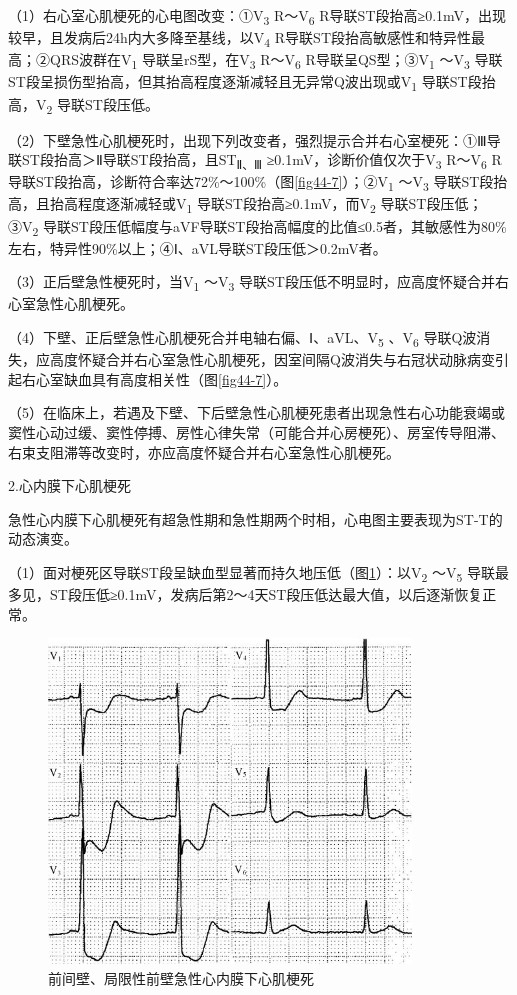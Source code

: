 （1）右心室心肌梗死的心电图改变：①V\textsubscript{3}
R～V\textsubscript{6}
R导联ST段抬高≥0.1mV，出现较早，且发病后24h内大多降至基线，以V\textsubscript{4}
R导联ST段抬高敏感性和特异性最高；②QRS波群在V\textsubscript{1}
导联呈rS型，在V\textsubscript{3} R～V\textsubscript{6}
R导联呈QS型；③V\textsubscript{1} ～V\textsubscript{3}
导联ST段呈损伤型抬高，但其抬高程度逐渐减轻且无异常Q波出现或V\textsubscript{1}
导联ST段抬高，V\textsubscript{2} 导联ST段压低。

（2）下壁急性心肌梗死时，出现下列改变者，强烈提示合并右心室梗死：①Ⅲ导联ST段抬高＞Ⅱ导联ST段抬高，且ST\textsubscript{Ⅱ、Ⅲ}
≥0.1mV，诊断价值仅次于V\textsubscript{3} R～V\textsubscript{6}
R导联ST段抬高，诊断符合率达72\%～100\%（图\ref{fig44-7}）；②V\textsubscript{1}
～V\textsubscript{3}
导联ST段抬高，且抬高程度逐渐减轻或V\textsubscript{1}
导联ST段抬高≥0.1mV，而V\textsubscript{2}
导联ST段压低；③V\textsubscript{2}
导联ST段压低幅度与aVF导联ST段抬高幅度的比值≤0.5者，其敏感性为80\%左右，特异性90\%以上；④Ⅰ、aVL导联ST段压低＞0.2mV者。

（3）正后壁急性梗死时，当V\textsubscript{1} ～V\textsubscript{3}
导联ST段压低不明显时，应高度怀疑合并右心室急性心肌梗死。

（4）下壁、正后壁急性心肌梗死合并电轴右偏、Ⅰ、aVL、V\textsubscript{5}
、V\textsubscript{6}
导联Q波消失，应高度怀疑合并右心室急性心肌梗死，因室间隔Q波消失与右冠状动脉病变引起右心室缺血具有高度相关性（图\ref{fig44-7}）。

（5）在临床上，若遇及下壁、下后壁急性心肌梗死患者出现急性右心功能衰竭或窦性心动过缓、窦性停搏、房性心律失常（可能合并心房梗死）、房室传导阻滞、右束支阻滞等改变时，亦应高度怀疑合并右心室急性心肌梗死。

2.心内膜下心肌梗死

急性心内膜下心肌梗死有超急性期和急性期两个时相，心电图主要表现为ST-T的动态演变。

（1）面对梗死区导联ST段呈缺血型显著而持久地压低（图\ref{fig44-12}）：以V\textsubscript{2}
～V\textsubscript{5}
导联最多见，ST段压低≥0.1mV，发病后第2～4天ST段压低达最大值，以后逐渐恢复正常。

\begin{figure}[!htbp]
 \centering
 \includegraphics[width=3.79167in,height=3.39583in]{./images/Image00720.jpg}
 \captionsetup{justification=centering}
 \caption{前间壁、局限性前壁急性心内膜下心肌梗死}
 \label{fig44-12}
  \end{figure} 

